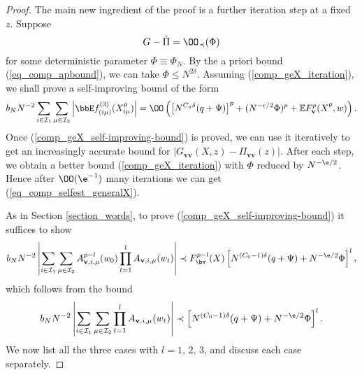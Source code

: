\begin{proof}
The main new ingredient of the proof is a further iteration step at a fixed $z$. Suppose
\begin{equation}\label{comp_geX_iteration}
G-\tilde\Pi=\OO_\prec(\Phi)
\end{equation}
for some deterministic parameter $\Phi\equiv \Phi_N$. By the a priori bound (\ref{eq_comp_apbound}), we can take $\Phi\le N^{2\delta}$. Assuming (\ref{comp_geX_iteration}), we shall prove a self-improving bound of the form
\begin{equation}\label{comp_geX_self-improving-bound}
b_N N^{-2}\sum_{i\in\mathcal I_1}\sum_{\mu\in\mathcal I_2}\left|\bbE f^{(3)}_{(i\mu)}(X_{i\mu}^\theta)\right|=\OO\left(\left[N^{C_a\delta} (q+\Psi)\right]^p+(N^{-\epsilon/2}\Phi)^p+\mathbb EF_{\mathbf v}^p(X^\theta,w)\right).
\end{equation}
Once (\ref{comp_geX_self-improving-bound}) is proved, we can use it iteratively to get an increasingly accurate bound 
for $\left|G_{\mathbf{vv}}(X,z)-\Pi_{\mathbf {vv}}(z)\right|$. After each step, we obtain a better bound (\ref{comp_geX_iteration}) with $\Phi$ reduced by $N^{-\e/2}$. Hence after $\OO(\e^{-1})$ many iterations we can get (\ref{eq_comp_selfest_generalX}).

As in Section \ref{section_words}, to prove (\ref{comp_geX_self-improving-bound}) it suffices to show 
\begin{equation}\label{comp_geX_words}
b_N N^{-2}\left|\sum_{i\in\mathcal I_1}\sum_{\mu\in\mathcal I_2}A^{p-l}_{\mathbf v, i, \mu}(w_0)\prod_{t=1}^{l}A_{\mathbf v, i, \mu}(w_t)\right|\prec F_{\bv}^{p-l}(X)\left[N^{(C_0-1)\delta}(q+\Psi) + N^{-\e/2}\Phi\right]^l,
\end{equation}
which follows from the bound
\begin{equation}\label{comp_geX_words2}
b_N N^{-2}\left|\sum_{i\in\mathcal I_1}\sum_{\mu\in\mathcal I_2}\prod_{t=1}^{l}A_{\mathbf v, i, \mu}(w_t)\right|\prec \left[N^{(C_0-1)\delta}(q+\Psi) + N^{-\e/2}\Phi\right]^l.
\end{equation}
We now list all the three cases with $l=1,\, 2,\, 3$, and discuss each case separately.  


\end{proof}
